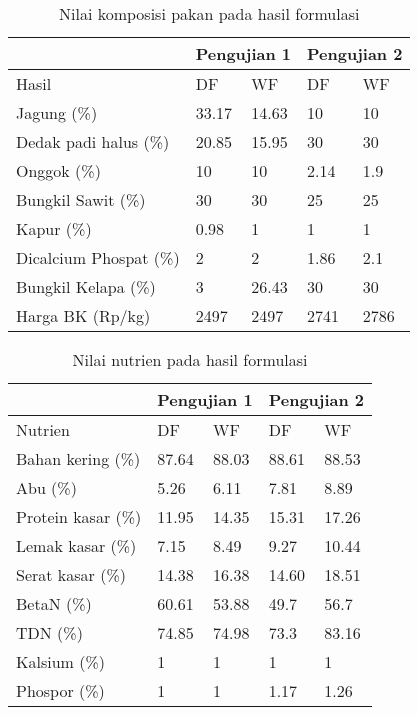 \begin{table}[h!]
	\centering
	\caption{Nilai komposisi pakan pada hasil formulasi}
	\label{my-label}
	\begin{tabular}{p{3.5cm}p{0.5cm}p{0.5cm}p{0.5cm}p{0.5cm}}
		\hline
		&\multicolumn{2}{c}{Pengujian 1} & \multicolumn{2}{c}{Pengujian 2} \\ \hline
		Hasil                  & DF          & WF      & DF   & WF      \\ \hline
		Jagung (\%)            & 33.17       & 14.63   & 10      & 10      \\
		Dedak padi halus (\%)  & 20.85       & 15.95   & 30      & 30      \\
		Onggok (\%)            & 10          & 10      & 2.14    & 1.9     \\
		Bungkil Sawit (\%)     & 30          & 30      & 25      & 25      \\
		Kapur (\%)             & 0.98        & 1       & 1       & 1       \\
		Dicalcium Phospat (\%) & 2           & 2       & 1.86    & 2.1     \\
		Bungkil Kelapa (\%)    & 3           & 26.43   & 30      & 30      \\
		Harga BK (Rp/kg)       & 2497      & 2497 & 2741 & 2786 \\ \hline
	\end{tabular}
\end{table}
\begin{table}[h!]
	\centering
	\caption{Nilai nutrien pada hasil formulasi}
	\label{my-label}
	\begin{tabular}{p{3.5cm}p{0.5cm}p{0.5cm}p{0.5cm}p{0.5cm}}
		\hline
		&\multicolumn{2}{c}{Pengujian 1} & \multicolumn{2}{c}{Pengujian 2} \\ \hline
		Nutrien            & DF          & WF    & DF    & WF    \\ \hline
		Bahan kering (\%)  & 87.64       & 88.03 & 88.61 & 88.53 \\
		Abu (\%)           & 5.26        & 6.11  & 7.81  & 8.89  \\
		Protein kasar (\%) & 11.95       & 14.35 & 15.31 & 17.26 \\
		Lemak kasar (\%)   & 7.15        & 8.49  & 9.27  & 10.44 \\
		Serat kasar (\%)   & 14.38       & 16.38 & 14.60 & 18.51 \\
		BetaN (\%)         & 60.61       & 53.88 & 49.7  & 56.7  \\
		TDN (\%)           & 74.85       & 74.98 & 73.3  & 83.16 \\
		Kalsium (\%)       & 1           & 1     & 1     & 1     \\
		Phospor (\%)       & 1           & 1     & 1.17  & 1.26  \\ \hline
	\end{tabular}
\end{table}